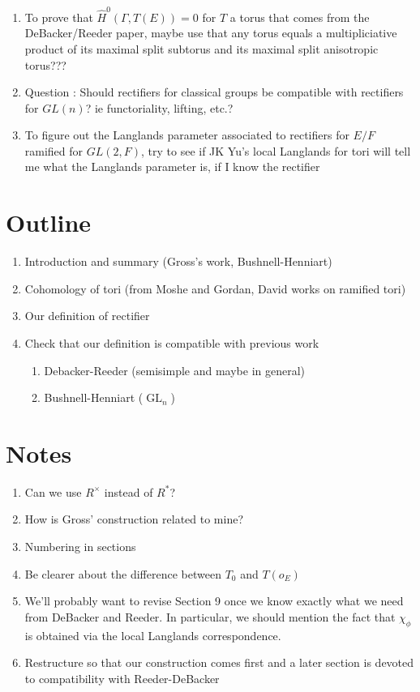 \documentclass{article}
\DeclareMathOperator{\GL}{GL}
\begin{document}
\begin{enumerate}
\item To prove that $\hat{H}^0(\Gamma, T(E)) = 0$ for $T$ a torus that comes from the DeBacker/Reeder paper, maybe use that any torus equals a multipliciative product of its maximal split subtorus and its maximal split anisotropic torus???

\item Question : Should rectifiers for classical groups be compatible with rectifiers for $GL(n)$? ie functoriality, lifting, etc.?

\item To figure out the Langlands parameter associated to rectifiers for $E/F$ ramified for $GL(2,F)$, try to see if JK Yu's local Langlands for tori will tell me what the Langlands parameter is, if I know the rectifier


\end{enumerate}

\section{Outline}

\begin{enumerate}
\item Introduction and summary (Gross's work, Bushnell-Henniart)
\item Cohomology of tori (from Moshe and Gordan, David works on ramified tori)
\item Our definition of rectifier
\item Check that our definition is compatible with previous work
\begin{enumerate}
\item Debacker-Reeder (semisimple and maybe in general)
\item Bushnell-Henniart ($\GL_n$)
\end{enumerate}

\end{enumerate}

\section{Notes}

\begin{enumerate}
\item Can we use $R^\times$ instead of $R^*$?
\item How is Gross' construction related to mine?
\item Numbering in sections
\item Be clearer about the difference between $T_0$ and $T(o_E)$
\item We'll probably want to revise Section 9 once we know exactly what we need from DeBacker and Reeder.  In particular, we should mention the fact that $\chi_\phi$ is obtained via the local Langlands correspondence.
\item  Restructure so that our construction comes first and a later section is devoted to compatibility with Reeder-DeBacker
\end{enumerate}
\end{document}
